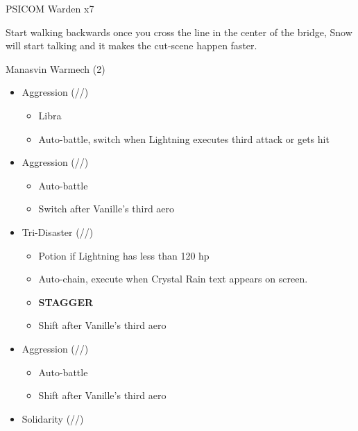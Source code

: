 \documentclass{report}
\begin{document}
\renewcommand{\first}{[1] Tri-Disaster (\rav/\rav/\rav)}

\renewcommand{\second}{[2] Solidarity (\com/\sen/\med)}

\renewcommand{\third}{[3] Aggression (\com/\com/\rav)}

\renewcommand{\fourth}{[4] Aggression (\com/\com/\rav)}

\begin{battle}{PSICOM Warden x7}
 
\end{battle}

Start walking backwards once you cross the line in the center of the bridge, Snow will start talking and it makes the cut-scene happen faster.

\begin{battle}{Manasvin Warmech (2)}
\begin{itemize}
    \item \third
    \begin{itemize}
        \item Libra
        \item Auto-battle, switch when Lightning executes third attack or gets hit
    \end{itemize}
    \item \fourth
    \begin{itemize}
        \item Auto-battle
        \item Switch after Vanille's third aero
    \end{itemize}
    \item \first
    \begin{itemize}
        \item Potion if Lightning has less than 120 hp
        \item Auto-chain, execute when Crystal Rain text appears on screen.
        \item \textbf{STAGGER}
        \item Shift after Vanille's third aero
    \end{itemize}
    \item \third
    \begin{itemize}
        \item Auto-battle
        \item Shift after Vanille's third aero
    \end{itemize}
    \item \second
    \begin{itemize}

\end{itemize}
\end{itemize}
\end{battle}
\end{document}
